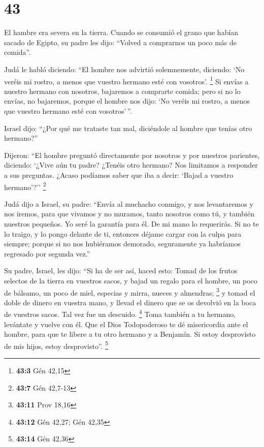 \hypertarget{section-42}{%
\section{43}\label{section-42}}

 El hambre era severa en la tierra.  Cuando
se consumió el grano que habían sacado de Egipto, su padre les dijo:
``Volved a comprarnos un poco más de comida''.

 Judá le habló diciendo: ``El hombre nos advirtió
solemnemente, diciendo: `No veréis mi rostro, a menos que vuestro
hermano esté con vosotros'. \footnote{\textbf{43:3} Gén 42,15}
 Si envías a nuestro hermano con nosotros, bajaremos a
comprarte comida;  pero si no lo envías, no bajaremos,
porque el hombre nos dijo: `No veréis mi rostro, a menos que vuestro
hermano esté con vosotros'\,''.

 Israel dijo: ``¿Por qué me trataste tan mal, diciéndole
al hombre que tenías otro hermano?''

 Dijeron: ``El hombre preguntó directamente por nosotros y
por nuestros parientes, diciendo: `¿Vive aún tu padre? ¿Tenéis otro
hermano? Nos limitamos a responder a sus preguntas. ¿Acaso podíamos
saber que iba a decir: `Bajad a vuestro hermano'?'' \footnote{\textbf{43:7}
  Gén 42,7-13}

 Judá dijo a Israel, su padre: ``Envía al muchacho
conmigo, y nos levantaremos y nos iremos, para que vivamos y no muramos,
tanto nosotros como tú, y también nuestros pequeños.  Yo
seré la garantía para él. De mi mano lo requerirás. Si no te lo traigo,
y lo pongo delante de ti, entonces déjame cargar con la culpa para
siempre;  porque si no nos hubiéramos demorado,
seguramente ya habríamos regresado por segunda vez.''

 Su padre, Israel, les dijo: ``Si ha de ser así, haced
esto: Tomad de los frutos selectos de la tierra en vuestros sacos, y
bajad un regalo para el hombre, un poco de bálsamo, un poco de miel,
especias y mirra, nueces y almendras; \footnote{\textbf{43:11} Prov
  18,16}  y tomad el doble de dinero en vuestra mano, y
llevad el dinero que se os devolvió en la boca de vuestros sacos. Tal
vez fue un descuido. \footnote{\textbf{43:12} Gén 42,27; Gén 42,35}
 Toma también a tu hermano, levántate y vuelve con él.
 Que el Dios Todopoderoso te dé misericordia ante el
hombre, para que te libere a tu otro hermano y a Benjamín. Si estoy
desprovisto de mis hijos, estoy desprovisto''. \footnote{\textbf{43:14}
  Gén 42,36}

